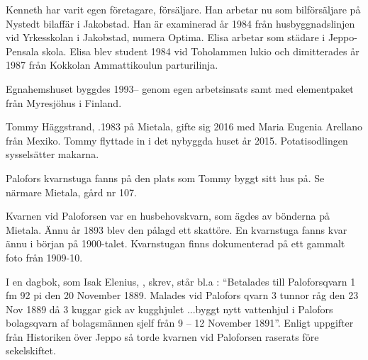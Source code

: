 Kenneth har varit egen företagare, försäljare. Han arbetar nu som bilförsäljare på Nystedt bilaffär i Jakobstad. Han är examinerad år 1984 från husbyggnadslinjen vid Yrkesskolan i Jakobstad, numera Optima. Elisa arbetar som städare i Jeppo-Pensala skola. Elisa blev student 1984 vid Toholammen lukio och dimitterades år 1987 från Kokkolan Ammattikoulun parturilinja.

Egnahemshuset byggdes 1993-- genom egen arbetsinsats samt med elementpaket från Myresjöhus i Finland.






Tommy Häggstrand,  .1983 på Mietala, gifte sig 2016 med Maria Eugenia Arellano från Mexiko. Tommy flyttade in i det nybyggda huset år 2015. Potatisodlingen sysselsätter makarna.

Palofors kvarnstuga fanns på den plats som Tommy byggt sitt hus på. Se närmare Mietala, gård nr 107.





Kvarnen vid Paloforsen var en husbehovskvarn, som ägdes av bönderna på 	Mietala. Ännu år 1893 blev den pålagd ett skattöre. En kvarnstuga fanns kvar ännu i början på 1900-talet. Kvarnstugan finns dokumenterad på ett gammalt foto från 1909-10.

I en dagbok, som Isak Elenius, , skrev,  står bl.a : ``Betalades till Paloforsqvarn 1 fm 92 pi den 20 November 1889. Malades vid Palofors qvarn 3 tunnor råg den 23  Nov 1889 då 3 kuggar gick av kugghjulet 	...byggt nytt vattenhjul i Palofors bolagsqvarn af bolagsmännen sjelf från 9 – 12 November 1891''. Enligt uppgifter från Historiken över Jeppo så torde kvarnen vid Paloforsen raserats före sekelskiftet.



